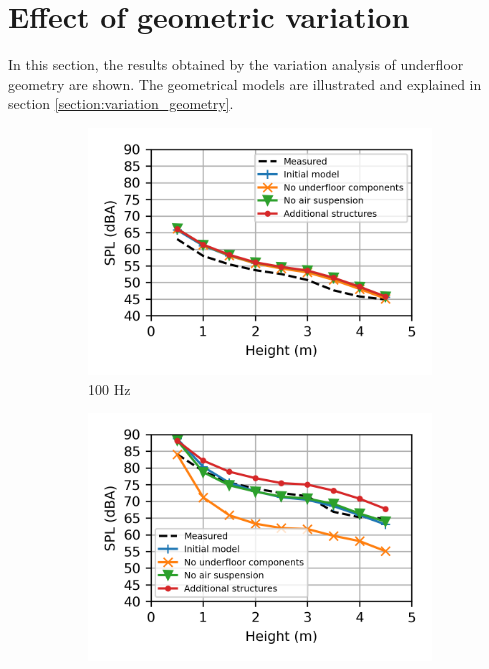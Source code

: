 \section{Effect of geometric variation}

In this section, the results obtained by the variation analysis of underfloor geometry are shown. The geometrical models are illustrated and explained in section \ref{section:variation_geometry}.

\begin{figure}[H]
	\centering
	\begin{subfigure}[b]{0.49\textwidth}
		\centering
		\includegraphics{fig/chap5/geometry_variation/third_octave_over_height/100_Hz.png}
		\caption{100 Hz}
	\end{subfigure}
	\hfill
	\begin{subfigure}[b]{0.49\textwidth}
		\centering
		\includegraphics{fig/chap5/geometry_variation/third_octave_over_height/250_Hz.png}

\end{subfigure}
\end{figure}
